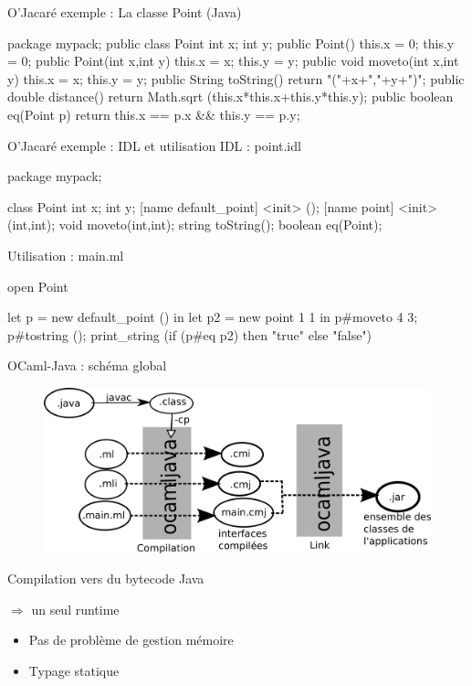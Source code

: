 \documentclass[xcolor={table,dvipsnames}]{beamer}
\begin{document}
\begin{frame}[fragile]{O'Jacaré exemple : La classe Point (Java)}

\bigskip

\begin{javaEx} 
  package mypack;
  public class Point {
    int x;
    int y;
    public Point() { 
      this.x = 0;
      this.y = 0;
    }
    public Point(int x,int y) {
      this.x = x;
      this.y = y;
    }
    public void moveto(int x,int y){
      this.x = x;
      this.y = y;
    }
    public String toString() {
      return "("+x+","+y+")";
    }
    public double distance() {
      return Math.sqrt (this.x*this.x+this.y*this.y);
    }
    public boolean eq(Point p) {
      return this.x == p.x  && this.y == p.y;
    }
  }
\end{javaEx}

\end{frame}





\begin{frame}[fragile]{O'Jacaré exemple : IDL et utilisation}
  IDL : point.idl
\begin{idlEx} 
package mypack;

class Point {
  int x;
  int y; 
  [name default_point] <init> ();
  [name point] <init> (int,int);
  void moveto(int,int);
  string toString();
  boolean eq(Point);
}
\end{idlEx}

Utilisation : main.ml
\begin{OCamlEx}
  open Point

  let p = new default_point () in
  let p2 = new point 1 1 in
  p#moveto 4 3;
  p#tostring ();
  print_string (if (p#eq p2) then "true" else "false")
\end{OCamlEx}
\end{frame}




\begin{frame}{OCaml-Java : schéma global}
\begin{figure}[h!]
  \centering
  \includegraphics[scale=0.8]{schemaOCamlJava.png}
\end{figure}
Compilation vers du bytecode Java

$\Rightarrow$ un seul runtime
\begin{itemize}
\item Pas de problème de gestion mémoire
\item Typage statique
\end{itemize}
\end{frame}
\end{document}
